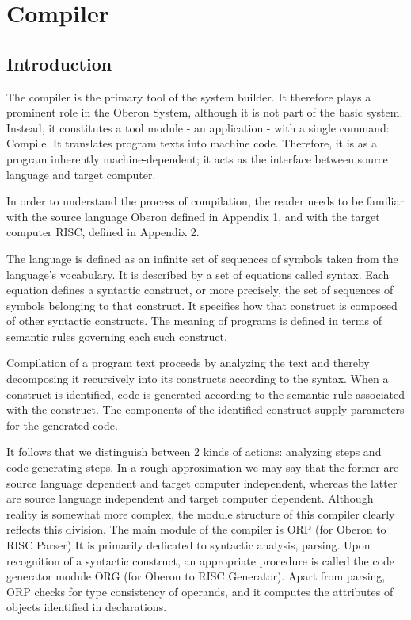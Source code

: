 \chapter{Compiler}
\label{ch:compiler}
\section{Introduction}
\label{sec:cintro}
The compiler is the primary tool of the system builder. It therefore plays a prominent role in the
Oberon System, although it is not part of the basic system. Instead, it constitutes a tool module - an
application - with a single command: Compile. It translates program texts into machine code.
Therefore, it is as a program inherently machine-dependent; it acts as the interface between source
language and target computer.

In order to understand the process of compilation, the reader needs to be familiar with the source
language Oberon defined in Appendix 1, and with the target computer RISC, defined in Appendix 2.

The language is defined as an infinite set of sequences of symbols taken from the language's
vocabulary. It is described by a set of equations called syntax. Each equation defines a syntactic
construct, or more precisely, the set of sequences of symbols belonging to that construct. It
specifies how that construct is composed of other syntactic constructs. The meaning of programs is
defined in terms of semantic rules governing each such construct.

Compilation of a program text proceeds by analyzing the text and thereby decomposing it
recursively into its constructs according to the syntax. When a construct is identified, code is
generated according to the semantic rule associated with the construct. The components of the
identified construct supply parameters for the generated code.

It follows that we distinguish between 2 kinds of actions: analyzing steps and code generating
steps. In a rough approximation we may say that the former are source language dependent and
target computer independent, whereas the latter are source language independent and target
computer dependent. Although reality is somewhat more complex, the module structure of this
compiler clearly reflects this division. The main module of the compiler is ORP (for Oberon to RISC
Parser) It is primarily dedicated to syntactic analysis, parsing. Upon recognition of a syntactic
construct, an appropriate procedure is called the code generator module ORG (for Oberon to RISC
Generator). Apart from parsing, ORP checks for type consistency of operands, and it computes the
attributes of objects identified in declarations.


